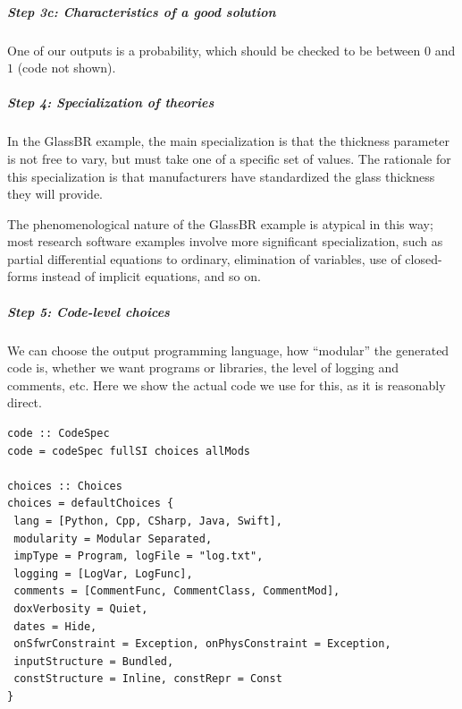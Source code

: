 \documentclass[a4paper,UKenglish,cleveref,autoref,thm-restate]{oasics-v2021}
\begin{document}
\subparagraph*{Step 3c: Characteristics of a good solution}
One of our outputs is a probability, which should be checked to be between \(0\)
and \(1\) (code not shown).

\subparagraph*{Step 4: Specialization of theories}
In the GlassBR example, the main specialization is that the thickness parameter
is not free to vary, but must take one of a specific set of values. The
rationale for this specialization is that manufacturers have standardized the
glass thickness they will provide.

The phenomenological nature of the GlassBR example is atypical in this way; most
research software examples involve more significant specialization, such as
partial differential equations to ordinary, elimination of variables, use of
closed-forms instead of implicit equations, and so on.

%
%
%
%

\subparagraph*{Step 5: Code-level choices}
We can choose the output programming language, how ``modular'' the generated
code is, whether we want programs or libraries, the level of logging and
comments, etc. Here we show the actual code we use for this, as it is reasonably
direct.


\begin{lstlisting}
code :: CodeSpec
code = codeSpec fullSI choices allMods

choices :: Choices
choices = defaultChoices {
 lang = [Python, Cpp, CSharp, Java, Swift], 
 modularity = Modular Separated,
 impType = Program, logFile = "log.txt", 
 logging = [LogVar, LogFunc],
 comments = [CommentFunc, CommentClass, CommentMod], 
 doxVerbosity = Quiet,
 dates = Hide, 
 onSfwrConstraint = Exception, onPhysConstraint = Exception,
 inputStructure = Bundled, 
 constStructure = Inline, constRepr = Const
}
\end{lstlisting}
\end{document}
